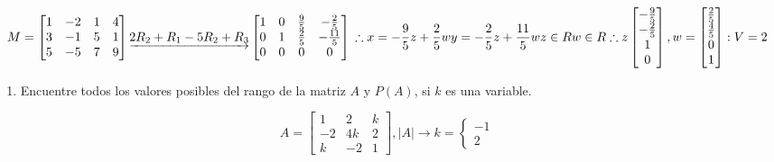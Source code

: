 \documentclass[
  11,
]{article}
\providecommand{\tightlist}{%
  \setlength{\itemsep}{0pt}\setlength{\parskip}{0pt}}
\begin{document}
\[
   M = \begin{bmatrix}1&-2&1&4\\3&-1&5&1\\5&-5&7&9\end{bmatrix} \underrightarrow{2R_2 + R_1 \\ -5R_2 + R_3} \begin{bmatrix}1&0&\frac{9}{5}&-\frac{2}{5}\\0&1&\frac{2}{5} & -\frac{11}{5} \\ 0&0&0&0\end{bmatrix} \\ \therefore \\ x = -\frac{9}{5}z + \frac{2}{5}w \\ y = -\frac{2}{5}z + \frac{11}{5}w \\ z \in R \\ w \in R \\ \therefore \\ z\begin{bmatrix}-\frac{9}{5} \\ -\frac{2}{5}\\1\\0\end{bmatrix}, w = \begin{bmatrix}\frac{2}{5}\\\frac{4}{5}\\0\\1\end{bmatrix} : V = 2
   \]

\begin{enumerate}
\def\labelenumi{\arabic{enumi}.}
\setcounter{enumi}{1}
\tightlist
\item
  Encuentre todos los valores posibles del rango de la matriz \(A\) y
  \(P(A)\), si \(k\) es una variable.
\end{enumerate}

\[
   A = \begin{bmatrix}1&2&k\\-2&4k&2\\k&-2&1\end{bmatrix}, |A| \rightarrow k = \begin{cases}-1\\2\end{cases}
   \]
\end{document}
